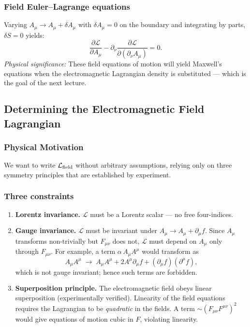 \subsubsection*{Field Euler--Lagrange equations}

Varying $A_\mu \to A_\mu + \delta A_\mu$ with $\delta A_\mu = 0$ on the boundary and integrating by parts, $\delta S = 0$ yields:
\begin{equation}\label{eq:EL-field}
  \boxed{\frac{\partial\mathcal{L}}{\partial A_\mu}
  - \partial_\nu\frac{\partial\mathcal{L}}{\partial(\partial_\nu A_\mu)} = 0.}
\end{equation}
\textit{Physical significance:} These field equations of motion will yield Maxwell's equations when the electromagnetic Lagrangian density is substituted — which is the goal of the next lecture.

\subsection{Determining the Electromagnetic Field Lagrangian}\label{subsec:Lem}

\subsubsection*{Physical Motivation}
We want to write $\mathcal{L}_{\rm field}$ without arbitrary assumptions, relying only on three symmetry principles that are established by experiment.

\subsubsection*{Three constraints}

\begin{enumerate}
  \item \textbf{Lorentz invariance.}  $\mathcal{L}$ must be a Lorentz scalar — no free four-indices.

  \item \textbf{Gauge invariance.}  $\mathcal{L}$ must be invariant under $A_\mu \to A_\mu + \partial_\mu f$.  Since $A_\mu$ transforms non-trivially but $F_{\mu\nu}$ does not, $\mathcal{L}$ must depend on $A_\mu$ only through $F_{\mu\nu}$.  For example, a term $\alpha\,A_\mu A^\mu$ would transform as
  \[
    A_\mu A^\mu \;\to\; A_\mu A^\mu + 2A^\mu\partial_\mu f + (\partial_\mu f)(\partial^\mu f),
  \]
  which is not gauge invariant; hence such terms are forbidden.

  \item \textbf{Superposition principle.}  The electromagnetic field obeys linear superposition (experimentally verified).  Linearity of the field equations requires the Lagrangian to be \emph{quadratic} in the fields.  A term $\sim (F_{\mu\nu}F^{\mu\nu})^2$ would give equations of motion cubic in $F$, violating linearity.
\end{enumerate}

